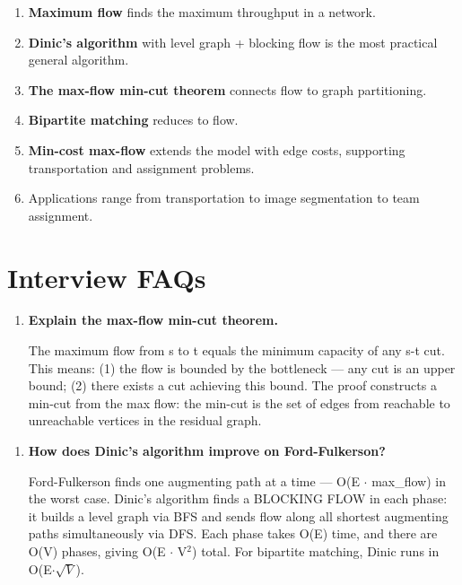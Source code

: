 \begin{enumerate}
\item \textbf{Maximum flow} finds the maximum throughput in a network.
\item \textbf{Dinic's algorithm} with level graph + blocking flow is the most practical general algorithm.
\item \textbf{The max-flow min-cut theorem} connects flow to graph partitioning.
\item \textbf{Bipartite matching} reduces to flow.
\item \textbf{Min-cost max-flow} extends the model with edge costs, supporting transportation and assignment problems.
\item Applications range from transportation to image segmentation to team assignment.
\end{enumerate}

\section{Interview FAQs}

\begin{enumerate}
\item \textbf{Explain the max-flow min-cut theorem.}

The maximum flow from s to t equals the minimum capacity of any s-t cut. This means: (1) the flow is bounded by the bottleneck — any cut is an upper bound; (2) there exists a cut achieving this bound. The proof constructs a min-cut from the max flow: the min-cut is the set of edges from reachable to unreachable vertices in the residual graph.
\end{enumerate}

\begin{enumerate}
\item \textbf{How does Dinic's algorithm improve on Ford-Fulkerson?}

Ford-Fulkerson finds one augmenting path at a time — O(E $\cdot$ max\_flow) in the worst case. Dinic's algorithm finds a BLOCKING FLOW in each phase: it builds a level graph via BFS and sends flow along all shortest augmenting paths simultaneously via DFS. Each phase takes O(E) time, and there are O(V) phases, giving O(E $\cdot$ V$^{2}$) total. For bipartite matching, Dinic runs in O(E$\cdot$$\sqrt {V}$).
\end{enumerate}

